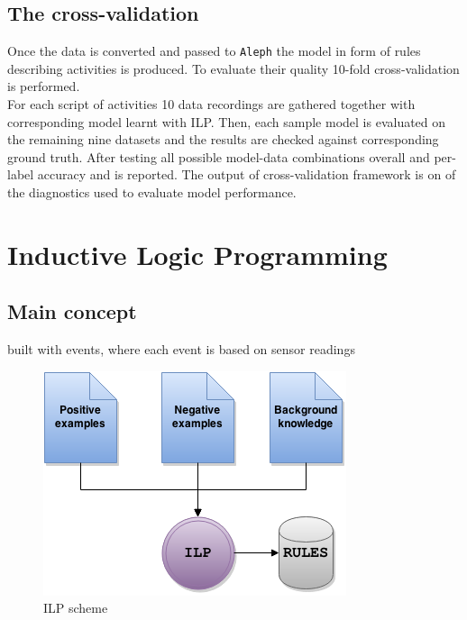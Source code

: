 \documentclass[12pt, a4paper, pdflatex, leqno, twoside, openright]{report}
\begin{document}
  \section{The cross-validation}
Once the data is converted and passed to \texttt{Aleph} the model in form of rules describing activities is produced. To evaluate their quality 10-fold cross-validation is performed.\\
For each script of activities 10 data recordings are gathered together with corresponding model learnt with ILP. Then, each sample model is evaluated on the remaining nine datasets and the results are checked against corresponding ground truth. After testing all possible model-data combinations overall and per-label accuracy and is reported. The output of cross-validation framework is on of the diagnostics used to evaluate model performance.

\chapter{Inductive Logic Programming\label{ch:ILP}}
  \section{Main concept}
  built with events, where each event is based on sensor readings

\begin{figure}
  \centering
  \includegraphics[scale=.5]{./gfx/ilp}
  \caption{ILP scheme\label{fig:ilp}}
\end{figure}
\end{document}
